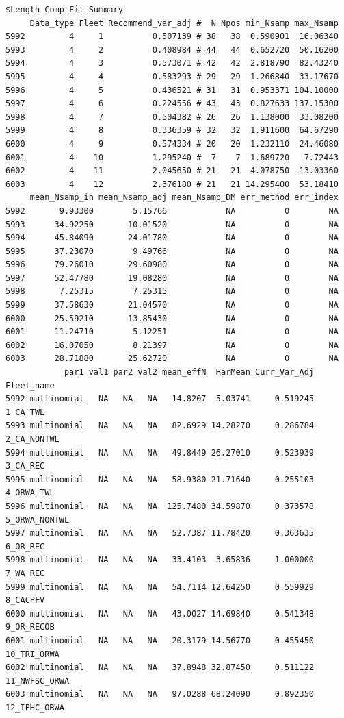 \documentclass[
]{scrartcl}
\begin{document}
\begin{verbatim}
$Length_Comp_Fit_Summary
     Data_type Fleet Recommend_var_adj #  N Npos min_Nsamp max_Nsamp
5992         4     1          0.507139 # 38   38  0.590901  16.06340
5993         4     2          0.408984 # 44   44  0.652720  50.16200
5994         4     3          0.573071 # 42   42  2.818790  82.43240
5995         4     4          0.583293 # 29   29  1.266840  33.17670
5996         4     5          0.436521 # 31   31  0.953371 104.10000
5997         4     6          0.224556 # 43   43  0.827633 137.15300
5998         4     7          0.504382 # 26   26  1.138000  33.08200
5999         4     8          0.336359 # 32   32  1.911600  64.67290
6000         4     9          0.574334 # 20   20  1.232110  24.46080
6001         4    10          1.295240 #  7    7  1.689720   7.72443
6002         4    11          2.045650 # 21   21  4.078750  13.03360
6003         4    12          2.376180 # 21   21 14.295400  53.18410
     mean_Nsamp_in mean_Nsamp_adj mean_Nsamp_DM err_method err_index
5992       9.93300        5.15766            NA          0        NA
5993      34.92250       10.01520            NA          0        NA
5994      45.84090       24.01780            NA          0        NA
5995      37.23070        9.49766            NA          0        NA
5996      79.26010       29.60980            NA          0        NA
5997      52.47780       19.08280            NA          0        NA
5998       7.25315        7.25315            NA          0        NA
5999      37.58630       21.04570            NA          0        NA
6000      25.59210       13.85430            NA          0        NA
6001      11.24710        5.12251            NA          0        NA
6002      16.07050        8.21397            NA          0        NA
6003      28.71880       25.62720            NA          0        NA
            par1 val1 par2 val2 mean_effN  HarMean Curr_Var_Adj    Fleet_name
5992 multinomial   NA   NA   NA   14.8207  5.03741     0.519245      1_CA_TWL
5993 multinomial   NA   NA   NA   82.6929 14.28270     0.286784   2_CA_NONTWL
5994 multinomial   NA   NA   NA   49.8449 26.27010     0.523939      3_CA_REC
5995 multinomial   NA   NA   NA   58.9380 21.71640     0.255103    4_ORWA_TWL
5996 multinomial   NA   NA   NA  125.7480 34.59870     0.373578 5_ORWA_NONTWL
5997 multinomial   NA   NA   NA   52.7387 11.78420     0.363635      6_OR_REC
5998 multinomial   NA   NA   NA   33.4103  3.65836     1.000000      7_WA_REC
5999 multinomial   NA   NA   NA   54.7114 12.64250     0.559929      8_CACPFV
6000 multinomial   NA   NA   NA   43.0027 14.69840     0.541348    9_OR_RECOB
6001 multinomial   NA   NA   NA   20.3179 14.56770     0.455450   10_TRI_ORWA
6002 multinomial   NA   NA   NA   37.8948 32.87450     0.511122 11_NWFSC_ORWA
6003 multinomial   NA   NA   NA   97.0288 68.24090     0.892350  12_IPHC_ORWA


\end{verbatim}
\end{document}
